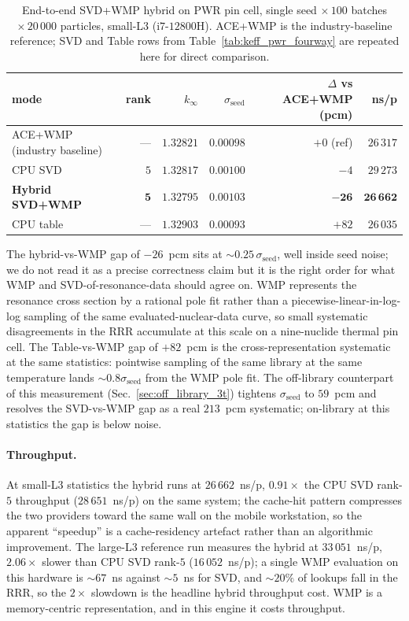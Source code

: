 \begin{table}[t]
\centering
\caption{End-to-end SVD+WMP hybrid on PWR pin cell, single
seed $\times\,100$ batches $\times\,20\,000$ particles,
small-L3 (i$7$-$12800$H). ACE+WMP is the industry-baseline
reference; SVD and Table rows from
Table~\ref{tab:keff_pwr_fourway} are repeated here for
direct comparison.}
\label{tab:hybrid_endtoend}
\begin{tabular}{@{}lrrrrr@{}}
\toprule
mode & rank & $k_\infty$ & $\sigma_\text{seed}$ &
$\Delta$ vs ACE+WMP (pcm) & ns/p \\
\midrule
ACE+WMP (industry baseline)   & ---       & $1.32821$ & $0.00098$ & $+0$ (ref) & $26\,317$ \\
CPU SVD                       & $5$       & $1.32817$ & $0.00100$ & $-4$       & $29\,273$ \\
\textbf{Hybrid SVD+WMP}        & $\mathbf{5}$ & $\mathbf{1.32795}$ & $\mathbf{0.00103}$ & $\mathbf{-26}$ & $\mathbf{26\,662}$ \\
CPU table                     & ---       & $1.32903$ & $0.00093$ & $+82$      & $26\,035$ \\
\bottomrule
\end{tabular}
\end{table}

The hybrid-vs-WMP gap of $-26$~pcm sits at
$\sim 0.25\,\sigma_\text{seed}$, well inside seed noise; we
do not read it as a precise correctness claim but it is the
right order for what WMP and SVD-of-resonance-data should
agree on. WMP represents the resonance cross section by a
rational pole fit rather than a piecewise-linear-in-log-log
sampling of the same evaluated-nuclear-data curve, so small
systematic disagreements in the RRR accumulate at this scale
on a nine-nuclide thermal pin cell. The Table-vs-WMP gap of
$+82$~pcm is the cross-representation systematic at the same
statistics: pointwise sampling of the same library at the
same temperature lands $\sim\!0.8\sigma_\text{seed}$ from
the WMP pole fit. The off-library counterpart of this
measurement (Sec.~\ref{sec:off_library_3t}) tightens
$\sigma_\text{seed}$ to $59$~pcm and resolves the SVD-vs-WMP
gap as a real $213$~pcm systematic; on-library at this
statistics the gap is below noise.

\paragraph{Throughput.}
At small-L3 statistics the hybrid runs at $26\,662$~ns/p,
$0.91\times$ the CPU SVD rank-$5$ throughput
($28\,651$~ns/p) on the same system; the cache-hit pattern
compresses the two providers toward the same wall on the
mobile workstation, so the apparent ``speedup'' is a
cache-residency artefact rather than an algorithmic
improvement. The large-L3 reference run measures the hybrid
at $33\,051$~ns/p, $2.06\times$ slower than CPU SVD
rank-$5$ ($16\,052$~ns/p); a single WMP evaluation on this
hardware is $\sim\!67$~ns against $\sim\!5$~ns for SVD,
and $\sim\!20\%$ of lookups fall in the RRR, so the
$2\times$ slowdown is the headline hybrid throughput cost.
WMP is a memory-centric representation, and in this engine
it costs throughput.

